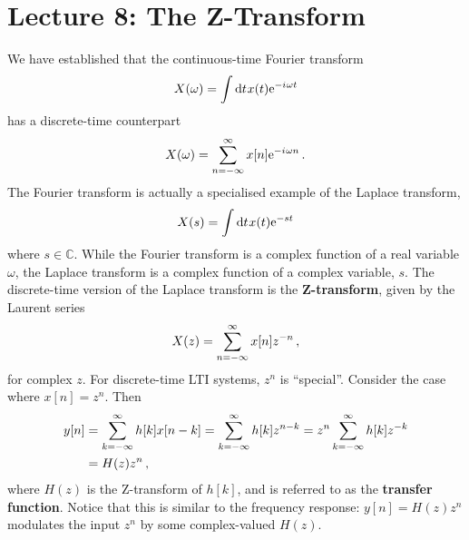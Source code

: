 \section{Lecture 8: The Z-Transform}

We have established that the continuous-time Fourier transform
%
\begin{displaymath}
  X(\omega) = \int\mathrm{d}t\mkern1mux(t)\mathrm{e}^{-{i\mkern1mu}\omega t}
\end{displaymath}
%
has a discrete-time counterpart
%
\begin{displaymath}
  X(\omega) = \sum_{n=-\infty}^\infty x[n]\mathrm{e}^{-{i\mkern1mu}\omega n} \,.
\end{displaymath}
%
The Fourier transform is actually a specialised example of
the Laplace transform,
%
\begin{equation}
  X(s) = \int\mathrm{d}t\mkern1mux(t)\mathrm{e}^{-st}
\end{equation}
%
where $s\in\mathbb{C}$. While the Fourier transform is a complex
function of a real variable $\omega$, the Laplace transform is a
complex function of a complex variable, $s$. The discrete-time
version of the Laplace transform is the \textbf{Z-transform},
given by the Laurent series
%
\begin{equation}
  X(z) = \sum_{n=-\infty}^\infty x[n]z^{-n} \,,
\end{equation}
%
for complex $z$. For discrete-time LTI systems, $z^n$ is ``special''.
Consider the case where $x[n] = z^n$. Then
%
\begin{align*}
  y[n] &= \sum_{k=-\infty}^\infty h[k]x[n-k] = \sum_{k=-\infty}^\infty h[k]z^{n-k} = z^n\sum_{k=-\infty}^\infty h[k]z^{-k} \\
  &= H(z)z^n \,,
\end{align*}
%
where $H(z)$ is the Z-transform of $h[k]$, and is referred to as the
\textbf{transfer function}. Notice that this is similar to the
frequency response: $y[n] = H(z)z^n$ modulates the input $z^n$ by some
complex-valued $H(z)$.

